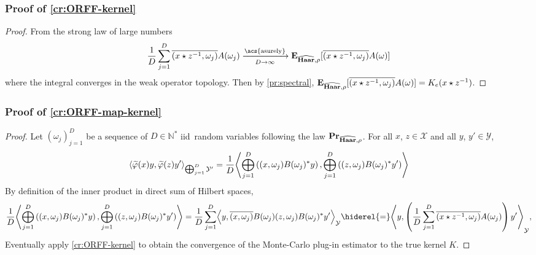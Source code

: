 \subsubsection{Proof of \texorpdfstring{\cref{cr:ORFF-kernel}}{Proposition %
\ref{cr:ORFF-kernel}}}
\begin{proof}
    From the strong law of large numbers
    \begin{dmath*}
        \frac{1}{D} \sum_{j=1}^D \conj{\pairing{x\groupop\inv{z},\omega_j}}
        A(\omega_j) \converges{\acs{asurely}}{D \to \infty}
        \expectation_{\dual{\Haar}, \rho}[\conj{\pairing{x \groupop z^{-1},
        \omega_j} }A(\omega)]
    \end{dmath*}
    where the integral converges in the weak operator topology. Then by
    \cref{pr:spectral}, ${\mathbf{{E}}}_{\widehat{\mathbf{Haar}}, \rho}[\overline{(x
    \star z^{-1}, \omega_j)}A(\omega)] = K_e(x\star{z}^{-1})$.
\end{proof}
\subsubsection{Proof of \texorpdfstring{\cref{cr:ORFF-map-kernel}}{%
Proposition~\ref{cr:ORFF-map-kernel}}}
\begin{proof}
    Let $(\omega_j)_{j=1}^D$ be a sequence of $D\in\mathbb{N}^*$
    \ac{iid}~random variables following the law
    ${\mathbf{{Pr}}}_{\widehat{\mathbf{Haar}},\rho}$. For all $x$, $z \in \mathcal{X}$ and
    all $y$, $y' \in \mathcal{Y}$,
    \begin{dmath*}
        \inner*{\tildePhi{\omega}(x)y,\tildePhi{\omega}(z)y'}_{\Vect_{j=1}^D
        \mathcal{Y}'}
        =\frac{1}{D}\inner*{\Vect_{j=1}^D \left(\pairing{x,
        \omega_j}B(\omega_j)^\adjoint y\right), \Vect_{j=1}^D\left(\pairing{z,
        \omega_j}B(\omega_j)^\adjoint y'\right)}
    \end{dmath*}
    By definition of the inner product in direct sum of Hilbert spaces,
    \begin{dmath*}
        \frac{1}{D}\inner*{\Vect_{j=1}^D \left(\pairing{x,
        \omega_j}B(\omega_j)^\adjoint y\right), \Vect_{j=1}^D\left(\pairing{z,
        \omega_j}B(\omega_j)^\adjoint y'\right)}
        = \frac{1}{D} \sum_{j=1}^D \inner*{y, \conj{\pairing{x,
        \omega_j}}B(\omega_j)\pairing{z, \omega_j}B(\omega_j)^\adjoint
        y'}_{\mathcal{Y}}
        \hiderel{=} \inner*{y, \left(\frac{1}{D} \sum_{j=1}^D
        \conj{\pairing{x\groupop \inv{z},
        \omega_j}}A(\omega_j)\right)y'}_{\mathcal{Y}},
    \end{dmath*}
    Eventually apply \cref{cr:ORFF-kernel} to obtain the convergence of the
    Monte-Carlo plug-in estimator to the true kernel $K$.
\end{proof}
